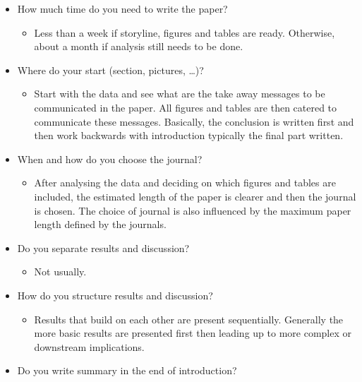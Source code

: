 \documentclass[12pt]{extarticle}
\begin{document}
\begin{itemize}
	\item How much time do you need to write the paper?
        \begin{itemize}
          \renewcommand\labelitemii{$\rightarrow$}
          \item Less than a week if storyline, figures and tables are ready. Otherwise, about a month if analysis still needs to be done.
        \end{itemize}
	\item Where do your start (section, pictures, …)?
        \begin{itemize}
          \renewcommand\labelitemii{$\rightarrow$}
          \item Start with the data and see what are the take away messages to be communicated in the paper. All figures and tables are then catered to communicate these messages. Basically, the conclusion is written first and then work backwards with introduction typically the final part written.
        \end{itemize}
	\item When and how do you choose the journal?
        \begin{itemize}
          \renewcommand\labelitemii{$\rightarrow$}
          \item After analysing the data and deciding on which figures and tables are included, the estimated length of the paper is clearer and then the journal is chosen. The choice of journal is also influenced by the maximum paper length defined by the journals.
        \end{itemize}
	\item Do you separate results and discussion?
        \begin{itemize}
          \renewcommand\labelitemii{$\rightarrow$}
          \item Not usually.
        \end{itemize}
	\item How do you structure results and discussion?
        \begin{itemize}
          \renewcommand\labelitemii{$\rightarrow$}
          \item Results that build on each other are present sequentially. Generally the more basic results are presented first then leading up to more complex or downstream implications.
        \end{itemize}
	\item Do you write summary in the end of introduction?

\end{itemize}
\end{document}

